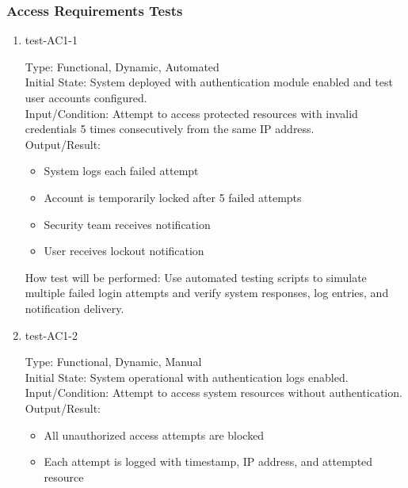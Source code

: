 \documentclass[12pt, titlepage]{article}
\begin{document}
\subsubsection{Access Requirements Tests} \label{section:4.3.1}

\begin{enumerate}

    \item{test-AC1-1\\} \label{test-AC1-1}
    
    Type: Functional, Dynamic, Automated\\
    
    Initial State: System deployed with authentication module enabled and test user accounts configured.\\
    
    Input/Condition: Attempt to access protected resources with invalid credentials 5 times consecutively from the same IP address.\\
    
    Output/Result: 
    \begin{itemize}
        \item System logs each failed attempt
        \item Account is temporarily locked after 5 failed attempts
        \item Security team receives notification
        \item User receives lockout notification
    \end{itemize}
    
    How test will be performed: Use automated testing scripts to simulate multiple failed login attempts and verify system responses, log entries, and notification delivery.

    \item{test-AC1-2\\}  \label{test-AC1-2}
    
    Type: Functional, Dynamic, Manual\\
    
    Initial State: System operational with authentication logs enabled.\\
    
    Input/Condition: Attempt to access system resources without authentication.\\
    
    Output/Result: 
    \begin{itemize}
        \item All unauthorized access attempts are blocked
        \item Each attempt is logged with timestamp, IP address, and attempted resource
    \end{itemize}
    

\end{enumerate}
\end{document}
